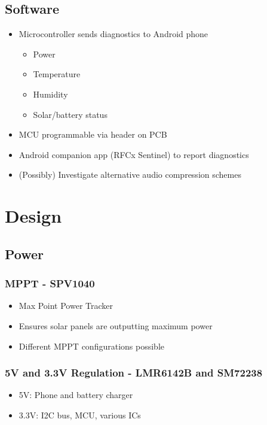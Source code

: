 \documentclass{article}
\numberwithin{figure}{section}
\numberwithin{equation}{section}
\begin{document}
{\subsection{Software}
\begin{itemize}
    \item Microcontroller sends diagnostics to Android phone
    \begin{itemize}
        \item Power
        \item Temperature
        \item Humidity
        \item Solar/battery status
    \end{itemize}
    \item MCU programmable via header on PCB
    \item Android companion app (RFCx Sentinel) to report diagnostics
    \item (Possibly) Investigate alternative audio compression schemes
\end{itemize}

\section{Design}
\subsection{Power}
\subsubsection{MPPT - SPV1040}
\begin{itemize}
    \item Max Point Power Tracker
    \item Ensures solar panels are outputting maximum power
    \item Different MPPT configurations possible
\end{itemize}

\subsubsection{5V and 3.3V Regulation - LMR6142B and SM72238}
\begin{itemize}
    \item 5V: Phone and battery charger
    \item 3.3V: I2C bus, MCU, various ICs
\end{itemize}

}
\end{document}
